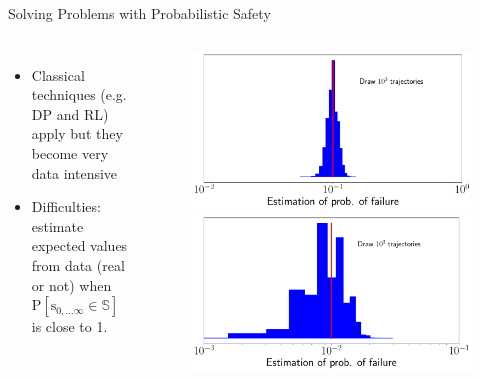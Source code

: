 \documentclass[lecture]{beamer}
\newcommand{\vect}[1]{\ensuremath{\boldsymbol{\mathrm{#1}}}}
\begin{document}
\begin{frame}{\normalsize Solving Problems with Probabilistic Safety}
\begin{columns}[t]
\begin{itemize}
\item Classical techniques (e.g. DP and RL) apply but they become very data intensive
\item Difficulties: estimate expected values from data (real or not) when $\mathrm{P}\left[ \vect s_{0,\ldots\infty}\in \mathbb S\right]$ is close to 1. 
\end{itemize}


\begin{overlayarea}{\textwidth}{0.6\textheight}
    \begin{figure}
     \newcommand{\FS}{1}
        {
        \center
	\includegraphics[width=1\textwidth,clip]{Codes/BasicsSafety/SafetyEstimation3_1.pdf}
	}
	      \only<2>
        {
        \center
	\includegraphics[width=1\textwidth,clip]{Codes/BasicsSafety/SafetyEstimation3_2.pdf}
	}
	      \only<3->
        {
        \center
}
\end{figure}
\end{overlayarea}
\end{columns}
\end{frame}
\end{document}
